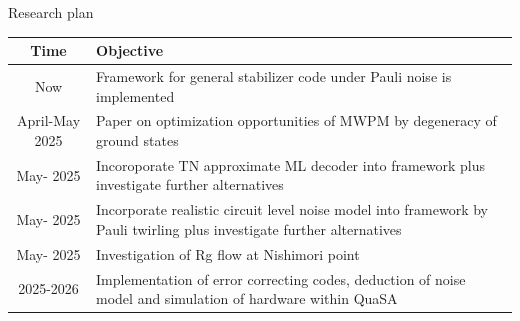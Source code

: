 \documentclass{dfki}
\begin{document}
\begin{frame}{Research plan}
	\begin{table}[h]
        \renewcommand{\arraystretch}{1.5} %
        \small
		\begin{tabular}{c|p{10cm}}
			\textbf{Time} &  \textbf{Objective} \\
			\hline
			Now & Framework for general stabilizer code under Pauli noise is implemented \\
			April-May 2025 & Paper on optimization opportunities of MWPM by degeneracy of ground states \\
			May- 2025 & Incoroporate TN approximate ML decoder into framework plus investigate further alternatives \\
			May- 2025 & Incorporate realistic circuit level noise model into framework by Pauli twirling plus investigate further alternatives \\
			May- 2025 & Investigation of Rg flow at Nishimori point \\
			2025-2026 & Implementation of error correcting codes, deduction of noise model and simulation of hardware within QuaSA\\
		\end{tabular}
	\end{table}
\end{frame}
\end{document}
